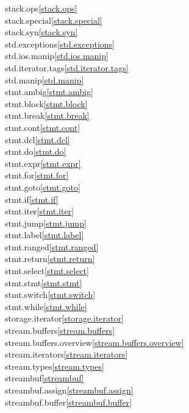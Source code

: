 \begin{multicols}{2}
stack.ops\quad\ref{stack.ops}\\
stack.special\quad\ref{stack.special}\\
stack.syn\quad\ref{stack.syn}\\
std.exceptions\quad\ref{std.exceptions}\\
std.ios.manip\quad\ref{std.ios.manip}\\
std.iterator.tags\quad\ref{std.iterator.tags}\\
std.manip\quad\ref{std.manip}\\
stmt.ambig\quad\ref{stmt.ambig}\\
stmt.block\quad\ref{stmt.block}\\
stmt.break\quad\ref{stmt.break}\\
stmt.cont\quad\ref{stmt.cont}\\
stmt.dcl\quad\ref{stmt.dcl}\\
stmt.do\quad\ref{stmt.do}\\
stmt.expr\quad\ref{stmt.expr}\\
stmt.for\quad\ref{stmt.for}\\
stmt.goto\quad\ref{stmt.goto}\\
stmt.if\quad\ref{stmt.if}\\
stmt.iter\quad\ref{stmt.iter}\\
stmt.jump\quad\ref{stmt.jump}\\
stmt.label\quad\ref{stmt.label}\\
stmt.ranged\quad\ref{stmt.ranged}\\
stmt.return\quad\ref{stmt.return}\\
stmt.select\quad\ref{stmt.select}\\
stmt.stmt\quad\ref{stmt.stmt}\\
stmt.switch\quad\ref{stmt.switch}\\
stmt.while\quad\ref{stmt.while}\\
storage.iterator\quad\ref{storage.iterator}\\
stream.buffers\quad\ref{stream.buffers}\\
stream.buffers.overview\quad\ref{stream.buffers.overview}\\
stream.iterators\quad\ref{stream.iterators}\\
stream.types\quad\ref{stream.types}\\
streambuf\quad\ref{streambuf}\\
streambuf.assign\quad\ref{streambuf.assign}\\
streambuf.buffer\quad\ref{streambuf.buffer}\\

\end{multicols}
